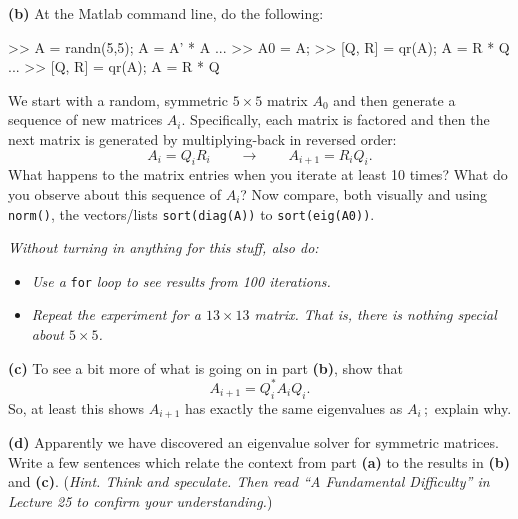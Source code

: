 \documentclass[12pt,dvipsnames]{amsart}
\newcommand{\epart}[1]{\medskip\noindent\textbf{(#1)}\quad }
\begin{document}
\epart{b} At the Matlab command line, do the following:
\begin{mVerb}
>> A = randn(5,5);  A = A' * A     %
...
>> A0 = A;                         %
>> [Q, R] = qr(A);  A = R * Q
...                                %
>> [Q, R] = qr(A);  A = R * Q
\end{mVerb}
We start with a random, symmetric $5\times 5$ matrix $A_0$ and then generate a sequence of new matrices $A_i$.  Specifically, each matrix is factored and then the next matrix is generated by multiplying-back in reversed order:
    $$A_i = Q_i R_i \qquad \longrightarrow \qquad A_{i+1} = R_i Q_i.$$
What happens to the matrix entries when you iterate at least 10 times?    What do you observe about this sequence of $A_i$?  Now compare, both visually and using \texttt{norm()}, the vectors/lists \verb|sort(diag(A))| to \verb|sort(eig(A0))|.

\medskip
\noindent \emph{Without turning in anything for this stuff, also do:}
\begin{itemize}
\item \emph{Use a} \texttt{for} \emph{loop to see results from 100 iterations.}
\item \emph{Repeat the experiment for a $13\times 13$ matrix.  That is, there is nothing special about $5\times 5$.}
\end{itemize} 

\epart{c} To see a bit more of what is going on in part \textbf{(b)}, show that
    $$A_{i+1} = Q_i^* A_i Q_i.$$
So, at least this shows $A_{i+1}$ has exactly the same eigenvalues as $A_i$\,; \,explain why.

\epart{d} Apparently we have discovered an eigenvalue solver for symmetric matrices.  Write a few sentences which relate the context from part \textbf{(a)} to the results in \textbf{(b)} and \textbf{(c)}.  (\emph{Hint.  Think and speculate.  Then read ``A Fundamental Difficulty'' in Lecture 25 to confirm your understanding.})
\end{document}
